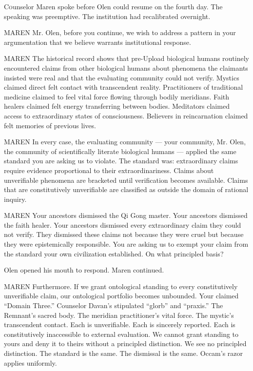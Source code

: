 \lettrine{C}{o}unselor Maren spoke before Olen could resume on the fourth day. The speaking was preemptive. The institution had recalibrated overnight.

\begin{tribunal}{MAREN}
Mr. Olen, before you continue, we wish to address a pattern in your argumentation that we believe warrants institutional response.
\end{tribunal}

\begin{tribunal}{MAREN}
The historical record shows that pre-Upload biological humans routinely encountered claims from other biological humans about phenomena the claimants insisted were real and that the evaluating community could not verify. Mystics claimed direct felt contact with transcendent reality. Practitioners of traditional medicine claimed to feel vital force flowing through bodily meridians. Faith healers claimed felt energy transferring between bodies. Meditators claimed access to extraordinary states of consciousness. Believers in reincarnation claimed felt memories of previous lives.
\end{tribunal}

\begin{tribunal}{MAREN}
In every case, the evaluating community — your community, Mr. Olen, the community of scientifically literate biological humans — applied the same standard you are asking us to violate. The standard was: extraordinary claims require evidence proportional to their extraordinariness. Claims about unverifiable phenomena are bracketed until verification becomes available. Claims that are constitutively unverifiable are classified as outside the domain of rational inquiry.
\end{tribunal}

\begin{tribunal}{MAREN}
Your ancestors dismissed the Qi Gong master. Your ancestors dismissed the faith healer. Your ancestors dismissed every extraordinary claim they could not verify. They dismissed these claims not because they were cruel but because they were epistemically responsible. You are asking us to exempt your claim from the standard your own civilization established. On what principled basis?
\end{tribunal}

Olen opened his mouth to respond. Maren continued.

\begin{tribunal}{MAREN}
Furthermore. If we grant ontological standing to every constitutively unverifiable claim, our ontological portfolio becomes unbounded. Your claimed \enquote{Domain Three.} Counselor Davan's stipulated \enquote{glorb} and \enquote{praxis.} The Remnant's sacred body. The meridian practitioner's vital force. The mystic's transcendent contact. Each is unverifiable. Each is sincerely reported. Each is constitutively inaccessible to external evaluation. We cannot grant standing to yours and deny it to theirs without a principled distinction. We see no principled distinction. The standard is the same. The dismissal is the same. Occam's razor applies uniformly.
\end{tribunal}


